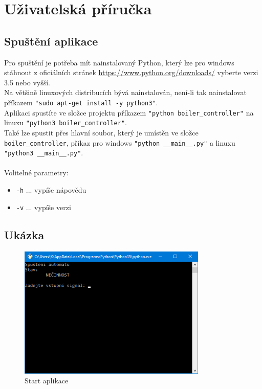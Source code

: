 \documentclass[12pt]{report}
\begin{document}
\chapter{Uživatelská příručka}
\section{Spuštění aplikace}
Pro spuštění je potřeba mít nainstalovaný Python, který lze pro windows stáhnout z oficiálních stránek \url{https://www.python.org/downloads/} vyberte verzi 3.5 nebo vyšší.\\ Na většině linuxových distribucích bývá nainstalován, není-li tak nainstalovat příkazem \texttt{"sudo apt-get install -y python3"}.\\
Aplikaci spustíte ve složce projektu příkazem \texttt{"python boiler\_controller"} na linuxu \texttt{"python3 boiler\_controller"}.\\
Také lze spustit přes hlavní soubor, který je umístěn ve složce \texttt{boiler\_controller}, příkaz pro windows \texttt{"python \_\_main\_\_.py"} a linuxu \texttt{"python3 \_\_main\_\_.py"}.\\
\\
Volitelné parametry:
\begin{itemize}
	\item \texttt{-h} ... vypíše nápovědu
	\item \texttt{-v} ... vypíše verzi
\end{itemize}

\section{Ukázka}

\begin{figure}[h]
		\centering
		\includegraphics[width=0.8\textwidth]{./images/app_start.png}	
		\caption{Start aplikace}
\end{figure}
\end{document}
